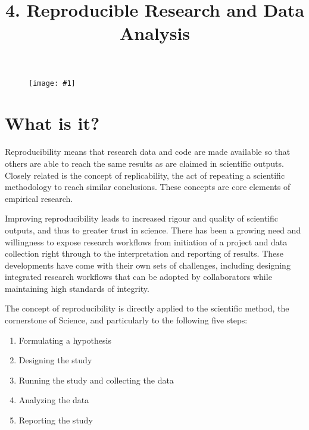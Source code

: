 \documentclass{article}
\newlength{\imgwidth}
\newcommand\scaledgraphics[2]{%
                
\settowidth{\imgwidth}{\texttt{[image: \#1]}}%
                
\setlength{\imgwidth}{\minof{\imgwidth}{#2\textwidth}}%
                
\texttt{[image: \#1]}%
                
}
\begin{document}
\title{4. Reproducible Research and Data Analysis}

\maketitle

\begin{figure}
\scaledgraphics{f5dde413-4c45-488f-8bc2-c2a57a02a812.png}{1}
\label{F94030121}
\end{figure}


\section{What is it?}\label{H6230651}



Reproducibility means that research data and code are made available so that others are able to reach the same results as are claimed in scientific outputs. Closely related is the concept of replicability, the act of repeating a scientific methodology to reach similar conclusions. These concepts are core elements of empirical research.


Improving reproducibility leads to increased rigour and quality of scientific outputs, and thus to greater trust in science. There has been a growing need and willingness to expose research workflows from initiation of a project and data collection right through to the interpretation and reporting of results. These developments have come with their own sets of challenges, including designing integrated research workflows that can be adopted by collaborators while maintaining high standards of integrity.


The concept of reproducibility is directly applied to the scientific method, the cornerstone of Science, and particularly to the following five steps:

\begin{enumerate}
\item Formulating a hypothesis


\item Designing the study


\item Running the study and collecting the data


\item Analyzing the data


\item Reporting the study


\end{enumerate}
\end{document}
